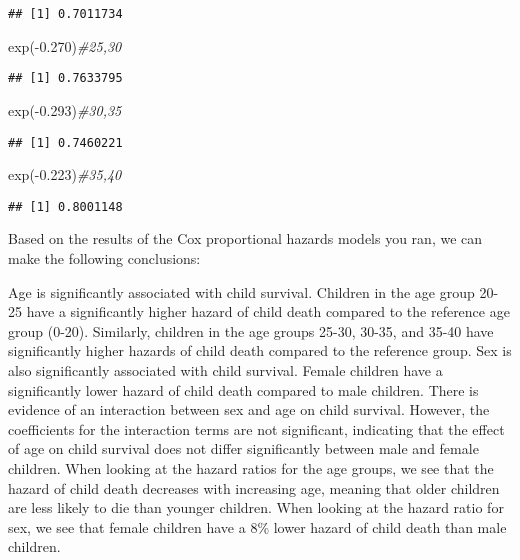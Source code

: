 \documentclass[
]{article}
\newenvironment{Shaded}{\begin{snugshade}}{\end{snugshade}}
\newcommand{\CommentTok}[1]{\textcolor[rgb]{0.56,0.35,0.01}{\textit{#1}}}
\newcommand{\FloatTok}[1]{\textcolor[rgb]{0.00,0.00,0.81}{#1}}
\newcommand{\FunctionTok}[1]{\textcolor[rgb]{0.00,0.00,0.00}{#1}}
\newcommand{\NormalTok}[1]{#1}
\newcommand{\SpecialCharTok}[1]{\textcolor[rgb]{0.00,0.00,0.00}{#1}}
\begin{document}
\begin{verbatim}
## [1] 0.7011734
\end{verbatim}

\begin{Shaded}
\begin{Highlighting}[]
\FunctionTok{exp}\NormalTok{(}\SpecialCharTok{{-}}\FloatTok{0.270}\NormalTok{)}\CommentTok{\#25,30}
\end{Highlighting}
\end{Shaded}

\begin{verbatim}
## [1] 0.7633795
\end{verbatim}

\begin{Shaded}
\begin{Highlighting}[]
\FunctionTok{exp}\NormalTok{(}\SpecialCharTok{{-}}\FloatTok{0.293}\NormalTok{)}\CommentTok{\#30,35}
\end{Highlighting}
\end{Shaded}

\begin{verbatim}
## [1] 0.7460221
\end{verbatim}

\begin{Shaded}
\begin{Highlighting}[]
\FunctionTok{exp}\NormalTok{(}\SpecialCharTok{{-}}\FloatTok{0.223}\NormalTok{)}\CommentTok{\#35,40}
\end{Highlighting}
\end{Shaded}

\begin{verbatim}
## [1] 0.8001148
\end{verbatim}

Based on the results of the Cox proportional hazards models you ran, we
can make the following conclusions:

Age is significantly associated with child survival. Children in the age
group 20-25 have a significantly higher hazard of child death compared
to the reference age group (0-20). Similarly, children in the age groups
25-30, 30-35, and 35-40 have significantly higher hazards of child death
compared to the reference group. Sex is also significantly associated
with child survival. Female children have a significantly lower hazard
of child death compared to male children. There is evidence of an
interaction between sex and age on child survival. However, the
coefficients for the interaction terms are not significant, indicating
that the effect of age on child survival does not differ significantly
between male and female children. When looking at the hazard ratios for
the age groups, we see that the hazard of child death decreases with
increasing age, meaning that older children are less likely to die than
younger children. When looking at the hazard ratio for sex, we see that
female children have a 8\% lower hazard of child death than male
children.
\end{document}
